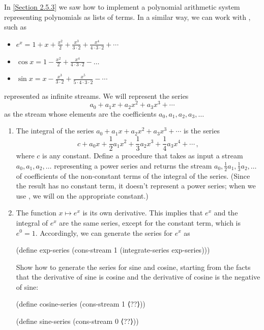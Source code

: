 \begin{exercise}
	\label{Exercise 3.59}
	In \cref{Section 2.5.3} we saw how to implement a polynomial arithmetic system representing polynomials as lists of terms.
	In a similar way, we can work with , such as
	\begin{itemize}

		\item
			\( e^x = 1 + x + \frac{x^2}{2} + \frac{x^3}{3 ⋅ 2} + \frac{x^4}{4 ⋅ 3 ⋅ 2} + \dotsb \)

		\item
			\( \cos x = 1 - \frac{x^2}{2} + \frac{x^4}{4 ⋅ 3 ⋅ 2} - \dots \)

		\item
			\( \sin x = x - \frac{x^3}{3 ⋅ 2} + \frac{x^5}{5 ⋅ 4 ⋅ 3 ⋅ 2} - \dotsb \)

	\end{itemize}
	represented as infinite streams.
	We will represent the series
	\[
		a_0 + a_1 x + a_2 x^2 + a_3 x^3 + \dotsb
	\]
	as the stream whose elements are the coefficients \( a_0, a_1, a_2, a_3, \dotsc \)
	\begin{enumerate}[label=\alph*., leftmargin=*]

		\item
			The integral of the series \( a_0 + a_1 x + a_2 x^2 + a_3 x^3 + \dotsb \) is the series
			\[
				c
				+ a_0 x
				+ \frac{1}{2} a_1 x^2
				+ \frac{1}{3} a_2 x^3
				+ \frac{1}{4} a_3 x^4
				+ \dotsb \,,
			\]
			where \( c \) is any constant.
			Define a procedure  that takes as input a stream \( a_0, a_1, a_2, \dotsc \) representing a power series and returns the stream \( a_0, \frac{1}{2} a_1, \frac{1}{3} a_2, \dotsc \) of coefficients of the non-constant terms of the integral of the series.
			(Since the result has no constant term, it doesn’t represent a power series;
			when we use , we will  on the appropriate constant.)

			\item
				The function \( x \mapsto e^x \) is its own derivative.
				This implies that \( e^x \) and the integral of \( e^x \) are the same series, except for the constant term, which is \( e^0 = 1 \).
				Accordingly, we can generate the series for \( e^x \) as
				\begin{scheme}
				  (define exp-series
				    (cons-stream 1 (integrate-series exp-series)))
				\end{scheme}

				Show how to generate the series for sine and cosine, starting from the facts that the derivative of sine is cosine and the derivative of cosine is the negative of sine:
				\begin{scheme}
				  (define cosine-series (cons-stream 1 ⟨??⟩))

				  (define sine-series (cons-stream 0 ⟨??⟩))
				\end{scheme}

		\end{enumerate}
\end{exercise}




